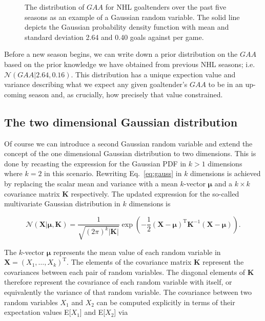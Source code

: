 \begin{figure}
  \centering
  \caption[Gaussian random variable in one dimension.]
      {The distribution of $GAA$ for NHL goaltenders over the past five
    seasons as an example of a Gaussian random variable. The solid line depicts
    the Gaussian probability density function with mean and standard
    deviation 2.64 and 0.40 goals against per game.}
  \label{fig:gaa1d}
\end{figure}

Before a new season begins, we can write down a prior distribution on the $GAA$
based on the prior knowledge we have obtained from previous NHL seasons; i.e.
$\mathcal{N}(GAA|2.64,0.16)$. This distribution has a unique expection value and
variance describing what we expect any given goaltender's $GAA$ to be in an
up-coming season and, as crucially, how precisely that value constrained.

\subsection{The two dimensional Gaussian distribution}
Of course we can introduce a second Gaussian random variable and extend the 
concept of the one dimensional Gaussian distribution to two dimensions. This is done
by recasting the expression for the Gaussian PDF in $k>1$
dimensions where $k=2$ in this scenario. Rewriting Eq.~\ref{eq:gauss} in $k$
dimensions is achieved by replacing the scalar mean and variance with a mean
$k$-vector $\boldsymbol{\mu}$ and a $k \times k$ covariance matrix $\mathbf{K}$
respectively. The updated expression for the so-called multivariate Gaussian
distribution in $k$ dimensions is

\begin{equation}
  \mathcal{N}(\mathbf{X}|\boldsymbol{\mu},\mathbf{K}) = \frac{1}{\sqrt{(2\pi)^k
      |\mathbf{K}|}} \exp{\left( -\frac{1}{2} (\mathbf{X} -
    \boldsymbol{\mu})^{\text{T}} \mathbf{K}^{-1} (\mathbf{X}-\boldsymbol{\mu})
    \right)}.
\end{equation}

\noindent The $k$-vector $\boldsymbol{\mu}$ represents the mean value of each
random variable in $\mathbf{X}=(X_1,\dots,X_k)^{\text{T}}$.
The elements of the covariance matrix
$\mathbf{K}$ represent the covariances between each pair of random variables.
The diagonal elements of $\mathbf{K}$ therefore represent the covariance of each
random variable with itself, or equivalently the variance of that random variable.
The covariance between two random variables $X_1$ and $X_2$ can be computed explicitly
in terms of their expectation values E[$X_1$] and E[$X_2$] via

